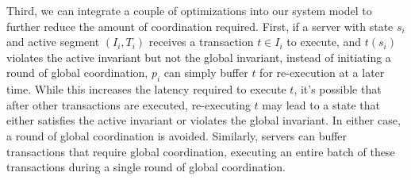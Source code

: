 
Third, we can integrate a couple of optimizations into our system model to
further reduce the amount of coordination required. First, if a server with
state $s_i$ and active segment $(I_i, T_i)$ receives a transaction $t \in I_i$
to execute, and $t(s_i)$ violates the active invariant but not the global
invariant, instead of initiating a round of global coordination, $p_i$ can
simply buffer $t$ for re-execution at a later time. While this increases the
latency required to execute $t$, it's possible that after other transactions
are executed, re-executing $t$ may lead to a state that either satisfies the
active invariant or violates the global invariant. In either case, a round of
global coordination is avoided. Similarly, servers can buffer transactions that
require global coordination, executing an entire batch of these transactions
during a single round of global coordination.
